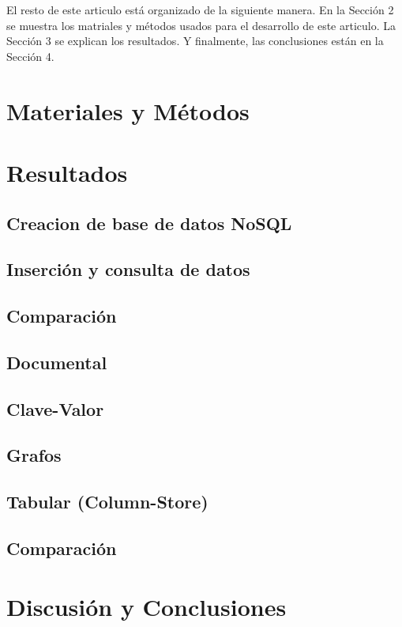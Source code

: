 \documentclass[%
 reprint,
 amsmath,amssymb,
 aps,
]{revtex4-1}
\begin{document}
\par El resto de este articulo está organizado de la siguiente manera. En la Sección 2 se muestra los matriales y métodos usados para el desarrollo de este articulo. La Sección 3 se explican los resultados. Y finalmente, las conclusiones están en la Sección 4.



\section{Materiales y Métodos}\label{sec:2}


\section {Resultados}\label{sec:3}
\subsection{Creacion de base de datos NoSQL}
\subsection{Inserción y consulta de datos}
\subsection{Comparación}
\subsection{Documental}
\subsection{Clave-Valor}
\subsection{Grafos}
\subsection{Tabular (Column-Store)}

\subsection{Comparación}
\section{Discusión y Conclusiones}\label{sec:4}







\end{document}
